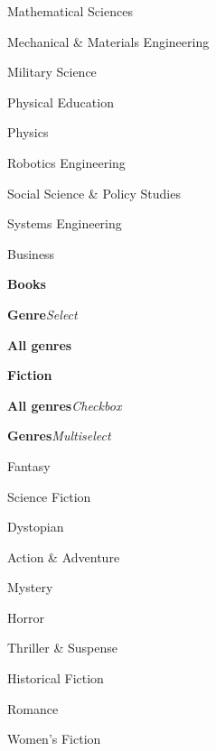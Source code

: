 \begin{CompactItemize}[leftmargin = *]
\begin{CompactItemize}
\begin{CompactItemize}
\begin{CompactItemize}
                \item Mathematical Sciences
                \item Mechanical \& Materials Engineering
                \item Military Science
                \item Physical Education
                \item Physics
                \item Robotics Engineering
                \item Social Science \& Policy Studies
                \item Systems Engineering
                \item Business
            \end{CompactItemize}
        \end{CompactItemize}
        \item \textbf{Books}
        \begin{CompactItemize}
            \item \textbf{Genre}\quad\textit{Select}
            \begin{CompactItemize}
                \item \textbf{All genres}
                \item \textbf{Fiction}
                \begin{CompactItemize}
                    \item \textbf{All genres}\quad\textit{Checkbox}
                    \item\label{cco:fiction_genres} \textbf{Genres}\quad\textit{Multiselect}
                    \begin{CompactItemize}
                        \item Fantasy
                        \item Science Fiction
                        \item Dystopian
                        \item Action \& Adventure
                        \item Mystery
                        \item Horror
                        \item Thriller \& Suspense
                        \item Historical Fiction
                        \item Romance
                        \item Women's Fiction

\end{CompactItemize}
\end{CompactItemize}
\end{CompactItemize}
\end{CompactItemize}
\end{CompactItemize}
\end{CompactItemize}
